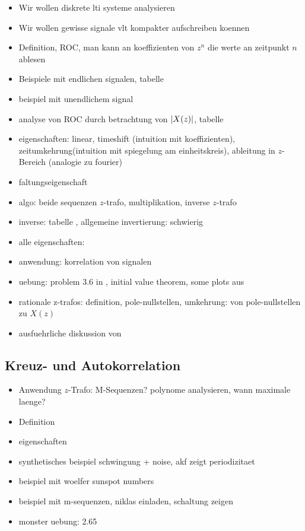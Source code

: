 \begin{itemize}
    \item Wir wollen diskrete \gls{lti} systeme analysieren
    \item Wir wollen gewisse signale vlt kompakter aufschreiben koennen
    \item Definition, ROC, man kann an koeffizienten von $z^n$ die werte an zeitpunkt $n$ ablesen
    \item Beispiele mit endlichen signalen, tabelle \cite[p155, top]{proakis2013}
    \item beispiel mit unendlichem signal
    \item analyse von ROC durch betrachtung von ${\left| X(z) \right|}$, tabelle \cite[p155, top]{proakis2013}
    \item eigenschaften: linear, timeshift (intuition mit koeffizienten), zeitumkehrung(intuition mit spiegelung am einheitskreis), ableitung in $z$-Bereich (analogie zu fourier)
    \item faltungseigenschaft
    \item algo: beide sequenzen $z$-trafo, multiplikation, inverse $z$-trafo
    \item inverse: tabelle \cite[tabelle 3.3]{proakis2013}, allgemeine invertierung: schwierig
    \item alle eigenschaften: \cite[tabelle 3.2]{proakis2013}
    \item anwendung: korrelation von signalen
    \item uebung: problem 3.6 in \cite{proakis2013}, initial value theorem, some plots aus \cite{proakis2013}
    \item rationale z-trafos: definition, pole-nullstellen, umkehrung: von pole-nullstellen zu $X(z)$
    \item ausfuehrliche diskussion von \cite[fig 3.3.5, 3.3.6]{proakis2013} 
    
\end{itemize}

\subsection{Kreuz- und Autokorrelation}\label{corr}

\begin{itemize}
    \item Anwendung $z$-Trafo: M-Sequenzen? polynome analysieren, wann maximale laenge?
    \item Definition
    \item eigenschaften
    \item synthetisches beispiel schwingung + noise, akf zeigt periodizitaet
    \item beispiel mit woelfer sunspot numbers
    \item beispiel mit m-sequenzen, niklas einladen, schaltung zeigen
    \item monster uebung: 2.65
\end{itemize}
